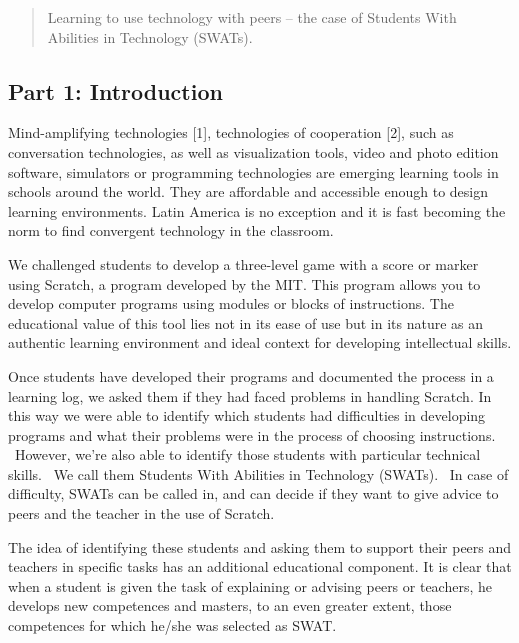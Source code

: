 
\begin{quote}
Learning to use technology with peers -- the case of Students With
Abilities in Technology (SWATs).
\end{quote}

\subsection{Part 1: Introduction}

Mind-amplifying technologies {[}1{]}, technologies of cooperation
{[}2{]}, such as conversation technologies, as well as visualization
tools, video and photo edition software, simulators or programming
technologies are emerging learning tools in schools around the world.
They are affordable and accessible enough to design learning
environments. Latin America is no exception and it is fast becoming the
norm to find convergent technology in the classroom.

We challenged students to develop a three-level game with a score or
marker using Scratch, a program developed by the MIT. This program
allows you to develop computer programs using modules or blocks of
instructions. The educational value of this tool lies not in its ease of
use but in its nature as an authentic learning environment and ideal
context for developing intellectual skills.

Once students have developed their programs and documented the process
in a learning log, we asked them if they had faced problems in handling
Scratch. In this way we were able to identify which students had
difficulties in developing programs and what their problems were in the
process of choosing instructions. ~However, we're also able to identify
those students with particular technical skills. ~We call them Students
With Abilities in Technology (SWATs). ~In case of difficulty, SWATs can
be called in, and can decide if they want to give advice to peers and
the teacher in the use of Scratch.

The idea of identifying these students and asking them to support their
peers and teachers in specific tasks has an additional educational
component. It is clear that when a student is given the task of
explaining or advising peers or teachers, he develops new competences
and masters, to an even greater extent, those competences for which
he/she was selected as SWAT.

